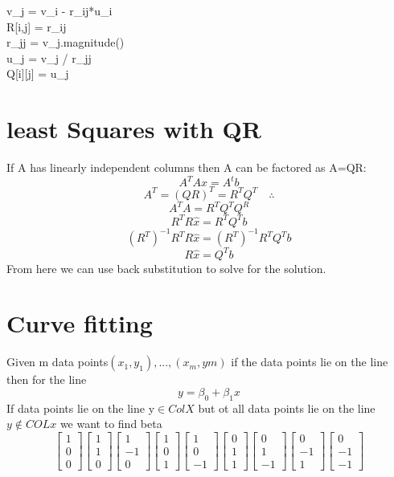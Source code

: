 \documentclass[12pt]{article}
\newcommand{\sect}[1]{\section*{#1}}
\begin{document}
            v_j = v_i - r_ij*u_i\\
            R[i,j] = r_ij\\
        r_jj = v_j.magnitude()\\
        u_j = v_j / r_jj\\
        Q[i][j] = u_j\\
\sect{least Squares with QR }
If A has linearly independent columns then A can be factored as A=QR:
\[
  A^TAx=A^tb
\]
\[
  A^T=(QR)^T=R^TQ^T\quad \therefore
\]
\[
  A^TA=R^TQ^TQ^R
\]
\[
  R^TR\hat{x}=R^TQ^Tb
\]
\[
  (R^T)^{-1}R^TR\hat{x}=(R^T)^{-1}R^TQ^Tb
\]
\[
  R\hat{x}=Q^Tb
\]
From here we can use back substitution to solve for the solution.
\sect{Curve fitting}
Given m data points$(x_1,y_1),...,(x_m,ym)$ if the data points lie on the line then for the line \[
  y=\beta_0+\beta_1x
\]
If data points lie on the line y$\in ColX$ but ot all data points lie on the line$y\notin COLx$ we want to find beta\\
\[
  \begin{bmatrix}
    1\\0\\0
  \end{bmatrix}
  \begin{bmatrix}
    1\\1\\0
  \end{bmatrix}
  \begin{bmatrix}
    1\\-1\\0
  \end{bmatrix}
  \begin{bmatrix}
    1\\0\\1
  \end{bmatrix}
  \begin{bmatrix}
    1\\0\\-1
  \end{bmatrix}
  \begin{bmatrix}
    0\\1\\1
  \end{bmatrix}
  \begin{bmatrix}
    0\\1\\-1
  \end{bmatrix}
  \begin{bmatrix}
    0\\-1\\1
  \end{bmatrix}
  \begin{bmatrix}
    0\\-1\\-1
  \end{bmatrix}
\]
\end{document}
